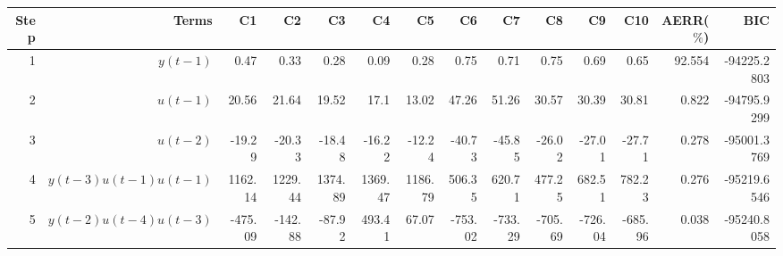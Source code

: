 \begin{tabular}{rrrrrrrrrrrrrr}
Step & Terms & C1 & C2 & C3 & C4 & C5 & C6 & C7 & C8 & C9 & C10 & AERR($\%$) & BIC \\ 
\hline 
1 & $y(t-1)$ & 0.47 & 0.33 & 0.28 & 0.09 & 0.28 & 0.75 & 0.71 & 0.75 & 0.69 & 0.65 & 92.554 & -94225.2803 \\ 
2 & $u(t-1)$ & 20.56 & 21.64 & 19.52 & 17.1 & 13.02 & 47.26 & 51.26 & 30.57 & 30.39 & 30.81 & 0.822 & -94795.9299 \\ 
3 & $u(t-2)$ & -19.29 & -20.33 & -18.48 & -16.22 & -12.24 & -40.73 & -45.85 & -26.02 & -27.01 & -27.71 & 0.278 & -95001.3769 \\ 
4 & $y(t-3)u(t-1)u(t-1)$ & 1162.14 & 1229.44 & 1374.89 & 1369.47 & 1186.79 & 506.35 & 620.71 & 477.25 & 682.51 & 782.23 & 0.276 & -95219.6546 \\ 
5 & $y(t-2)u(t-4)u(t-3)$ & -475.09 & -142.88 & -87.92 & 493.41 & 67.07 & -753.02 & -733.29 & -705.69 & -726.04 & -685.96 & 0.038 & -95240.8058 \\ 
\hline 
\end{tabular}